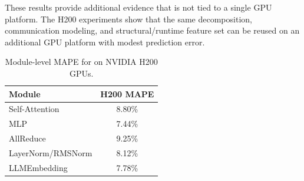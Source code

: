 These results provide additional evidence that \sys{} is not tied to a single GPU platform. 
The H200 experiments show that the same decomposition, communication modeling, and structural/runtime feature set can be reused on an additional GPU platform with modest prediction error.

\begin{table}[H]
\centering
\small
\setlength{\tabcolsep}{6pt}
\renewcommand{\arraystretch}{1.05}

\begin{tabular}{lc}
\toprule
\textbf{Module} & \textbf{H200 MAPE} \tabularnewline
\midrule
\rowcolor{rowblue} Self-Attention      & 8.80\% \tabularnewline
MLP                                    & 7.44\% \tabularnewline
\rowcolor{rowblue} AllReduce           & 9.25\% \tabularnewline
LayerNorm/RMSNorm                      & 8.12\% \tabularnewline
\rowcolor{rowblue} LLMEmbedding        & 7.78\% \tabularnewline
\bottomrule
\end{tabular}

\vspace{-6pt}
\caption{Module-level MAPE for \sys{} on NVIDIA H200 GPUs.}
\label{tab:h200_module_results}
\vspace{-6pt}
\end{table}




